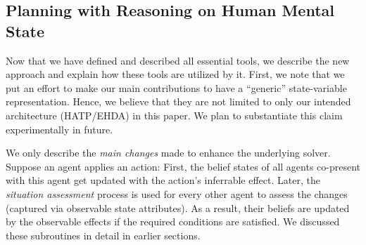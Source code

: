 \documentclass[letterpaper]{article} %
\begin{document}
% 



\subsection{Planning with Reasoning on Human Mental State }
Now that we have defined and described all essential tools, we describe the new approach and explain how these tools are utilized by it. 
First, we note that we put an effort to make our main contributions to have a ``generic'' state-variable representation. Hence, we believe that they are not limited to only our intended architecture (HATP/EHDA) in this paper. We plan to substantiate this claim experimentally in future.

We only describe the \textit{main changes} made to enhance the underlying solver. 
Suppose an agent applies an action: First, the belief states of all agents co-present with this agent get updated with the action's inferrable effect. Later, the \textit{situation assessment} process is used for every other agent to assess the changes (captured via observable state attributes). As a result, their beliefs are updated by the observable effects if the required conditions are satisfied. We discussed these subroutines in detail in earlier sections.
\end{document}
